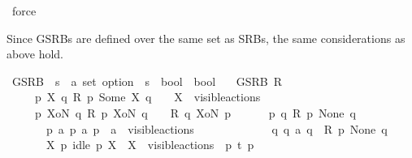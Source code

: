 \begin{isabellebody}
\ force%
\endisatagproof
{\isafoldproof}%
%
\isadelimproof
%
\endisadelimproof
%
\isadelimdocument
%
\endisadelimdocument
%
\isatagdocument
%
\isamarkuptrue%
%
\endisatagdocument
{\isafolddocument}%
%
\isadelimdocument
%
\endisadelimdocument
%
\begin{isamarkuptext}%
Since GSRBs are defined over the same set as SRBs, the same considerations as above hold.%
\end{isamarkuptext}\isamarkuptrue%
%
\isanewline
{}\isamarkupfalse%
\ GSRB\ {\isacharcolon}{\kern0pt}{\isacharcolon}{\kern0pt}\ {\isacartoucheopen}{\isacharparenleft}{\kern0pt}{\isacharprime}{\kern0pt}s\ {\isasymRightarrow}\ {\isacharprime}{\kern0pt}a\ set\ option\ {\isasymRightarrow}\ {\isacharprime}{\kern0pt}s\ {\isasymRightarrow}\ bool{\isacharparenright}{\kern0pt}\ {\isasymRightarrow}\ bool{\isacartoucheclose}\isanewline
\ \ \ {\isacartoucheopen}GSRB\ R\ {\isasymequiv}\isanewline
\ \ \ \ {\isacharparenleft}{\kern0pt}{\isasymforall}\ p\ X\ q{\isachardot}{\kern0pt}\ R\ p\ {\isacharparenleft}{\kern0pt}Some\ X{\isacharparenright}{\kern0pt}\ q\ \ {\isasymlongrightarrow}\ \ X\ {\isasymsubseteq}\ visible{\isacharunderscore}{\kern0pt}actions{\isacharparenright}{\kern0pt}\ {\isasymand}\isanewline
\ \ \ \ {\isacharparenleft}{\kern0pt}{\isasymforall}\ p\ XoN\ q{\isachardot}{\kern0pt}\ R\ p\ XoN\ q\ \ {\isasymlongrightarrow}\ \ R\ q\ XoN\ p{\isacharparenright}{\kern0pt}\ {\isasymand}\isanewline
\isanewline
\ \ \ \ {\isacharparenleft}{\kern0pt}{\isasymforall}\ p\ q{\isachardot}{\kern0pt}\ R\ p\ None\ q\ {\isasymlongrightarrow}\isanewline
\ \ \ \ \ \ {\isacharparenleft}{\kern0pt}{\isasymforall}\ p{\isacharprime}{\kern0pt}\ a{\isachardot}{\kern0pt}\ p\ {\isasymlongmapsto}a\ p{\isacharprime}{\kern0pt}\ {\isasymand}\ a\ {\isasymin}\ visible{\isacharunderscore}{\kern0pt}actions\ {\isasymunion}\ {\isacharbraceleft}{\kern0pt}{\isasymtau}{\isacharbraceright}{\kern0pt}\ \ {\isasymlongrightarrow}\isanewline
\ \ \ \ \ \ \ \ {\isacharparenleft}{\kern0pt}{\isasymexists}\ q{\isacharprime}{\kern0pt}{\isachardot}{\kern0pt}\ q\ {\isasymlongmapsto}a\ q{\isacharprime}{\kern0pt}\ {\isasymand}\ R\ p{\isacharprime}{\kern0pt}\ None\ q{\isacharprime}{\kern0pt}{\isacharparenright}{\kern0pt}{\isacharparenright}{\kern0pt}\ {\isasymand}\isanewline
\ \ \ \ \ \ {\isacharparenleft}{\kern0pt}{\isasymforall}\ X\ p{\isacharprime}{\kern0pt}{\isachardot}{\kern0pt}\ idle\ p\ X\ {\isasymand}\ X\ {\isasymsubseteq}\ visible{\isacharunderscore}{\kern0pt}actions\ {\isasymand}\ p\ {\isasymlongmapsto}t\ p{\isacharprime}{\kern0pt}\ \ {\isasymlongrightarrow}\ \ \isanewline

\end{isabellebody}
